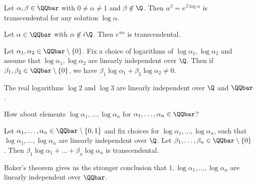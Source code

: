 \begin{thmn}
	Let \( \alpha, \beta \in \QQbar \) with \( 0 \neq \alpha \neq 1 \) and \( \beta \not\in \Q \).
	Then \( a^\beta = e^{\beta \log \alpha} \) is transcendental for any solution \( \log \alpha \).
\end{thmn}

\begin{cor}
	Let \( \alpha \in \QQbar \) with \( \alpha \not\in i\Q \).
	Then \( e^{\pi\alpha} \) is transcendental.
\end{cor}

\begin{cor}
	Let \( \alpha_1, \alpha_2 \in \QQbar \setminus \{0\} \).
	Fix a choice of logarithms of \( \log \alpha_1, \log\alpha_2 \) and assume that \( \log \alpha_1, \log\alpha_2 \) are linearly independent over \( \Q \).
	Then if \( \beta_1, \beta_2 \in \QQbar \setminus \{0\} \), we have \( \beta_1 \log\alpha_1 + \beta_2 \log\alpha_2 \neq 0 \).
\end{cor}

\begin{exmp*}
	The real logarithms \( \log 2 \) and \( \log 3 \) are linearly independent over \( \Q \) and \( \QQbar \).
\end{exmp*}

\begin{frage*}
	How about elements \( \log \alpha_1, \dotsc, \log\alpha_n \) for \( \alpha_1,\dotsc,\alpha_n \in \QQbar \)?
\end{frage*}

\begin{thmn}[Baker, 1965]
	Let \( \alpha_1, \dotsc, \alpha_n \in \QQbar \setminus \{0,1\} \) and fix choices for \( \log\alpha_1, \dotsc, \log\alpha_n \), such that \( \log\alpha_1, \dotsc, \log\alpha_n \) are linearly independent over \( \Q \).
	Let \( \beta_1, \dotsc, \beta_n \in \QQbar \setminus \{0\} \).
	Then \( \beta_1 \log\alpha_1 + \dots + \beta_n \log\alpha_n \) is transcendental.
\end{thmn}

\begin{rem*}
	Baker's theorem gives us the stronger conclusion that \( 1, \log\alpha_1, \dotsc, \log\alpha_n \) are linearly independent over \( \QQbar \).
\end{rem*}

